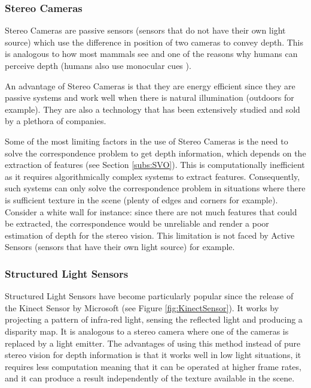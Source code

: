 \documentclass[11pt]{article}
\begin{document}
	\subsubsection{Stereo Cameras}
	
Stereo Cameras are passive sensors (sensors that do not have their own light source) which use the difference in position of two cameras to convey depth. This is analogous to how most mammals see and one of the reasons why humans can perceive depth (humans also use monocular cues \cite{goldstein2016sensation}).

An advantage of Stereo Cameras is that they are energy efficient since they are passive systems and work well when there is natural illumination (outdoors for example). They are also a technology that has been extensively studied and sold by a plethora of companies.

Some of the most limiting factors in the use of Stereo Cameras is the need to solve the correspondence problem to get depth information, which depends on the extraction of features (see Section \ref{subs:SVO}). This is computationally inefficient as it requires algorithmically complex systems to extract features. Consequently, such systems can only solve the correspondence problem in situations where there is sufficient texture in the scene (plenty of edges and corners for example). Consider a white wall for instance: since there are not much features that could be extracted, the correspondence would be unreliable and render a poor estimation of depth for the stereo vision. This limitation is not faced by Active Sensors (sensors that have their own light source) for example.

	\subsubsection{Structured Light Sensors}

Structured Light Sensors have become particularly popular since the release of the Kinect Sensor by Microsoft \cite{kinectfusion} (see Figure \ref{fig:KinectSensor}). It works by projecting a pattern of infra-red light, sensing the reflected light and producing a disparity map. It is analogous to a stereo camera where one of the cameras is replaced by a light emitter. The advantages of using this method instead of pure stereo vision for depth information is that it works well in low light situations, it requires less computation meaning that it can be operated at higher frame rates, and it can produce a result independently of the texture available in the scene.
\end{document}
